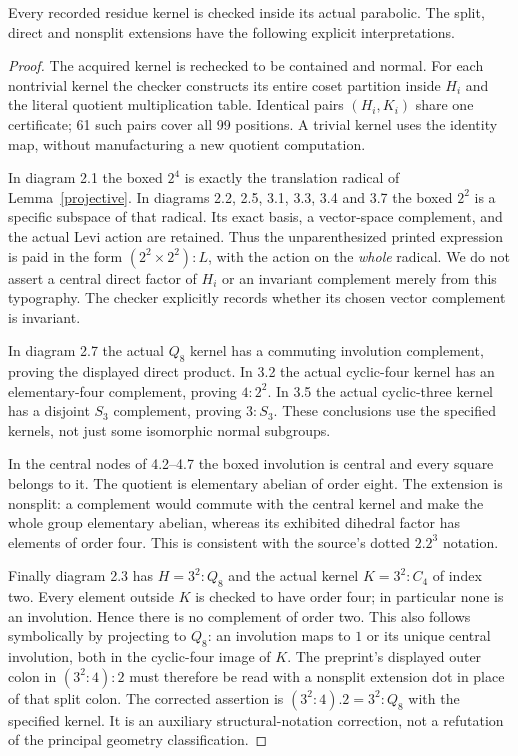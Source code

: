 \documentclass[11pt]{article}
\begin{document}
\begin{lemma}\label{kernel}
Every recorded residue kernel is checked inside its actual parabolic.
The split, direct and nonsplit extensions have the following explicit
interpretations.
\end{lemma}
\begin{proof}
The acquired kernel is rechecked to be contained and normal. For each
nontrivial kernel the checker constructs its entire coset partition
inside $H_i$ and the literal quotient multiplication table. Identical
pairs $(H_i,K_i)$ share one certificate; 61 such pairs cover all 99
positions. A trivial kernel uses the identity map, without manufacturing
a new quotient computation.

In diagram 2.1 the boxed $2^4$ is exactly the translation radical of
Lemma~\ref{projective}. In diagrams 2.2, 2.5, 3.1, 3.3, 3.4 and 3.7
the boxed $2^2$ is a specific subspace of that radical. Its exact basis,
a vector-space complement, and the actual Levi action are retained.
Thus the unparenthesized printed expression is paid in the form
$(2^2\times2^2):L$, with the action on the \emph{whole} radical.
We do not assert a central direct factor of $H_i$ or an invariant
complement merely from this typography. The checker explicitly records
whether its chosen vector complement is invariant.

In diagram 2.7 the actual $Q_8$ kernel has a commuting involution
complement, proving the displayed direct product. In 3.2 the actual
cyclic-four kernel has an elementary-four complement, proving $4:2^2$.
In 3.5 the actual cyclic-three kernel has a disjoint $S_3$ complement,
proving $3:S_3$. These conclusions use the specified kernels, not just
some isomorphic normal subgroups.

In the central nodes of 4.2--4.7 the boxed involution is central and
every square belongs to it. The quotient is elementary abelian of
order eight. The extension is nonsplit: a complement would commute
with the central kernel and make the whole group elementary abelian,
whereas its exhibited dihedral factor has elements of order four.
This is consistent with the source's dotted $2.2^3$ notation.

Finally diagram 2.3 has $H=3^2:Q_8$ and the actual kernel
$K=3^2:C_4$ of index two. Every element outside $K$ is checked to
have order four; in particular none is an involution. Hence there
is no complement of order two. This also follows symbolically by
projecting to $Q_8$: an involution maps to $1$ or its unique central
involution, both in the cyclic-four image of $K$.
The preprint's displayed outer colon in $(3^2:4):2$ must therefore
be read with a nonsplit extension dot in place of that split colon.
The corrected assertion is $(3^2:4).2=3^2:Q_8$ with the specified
kernel. It is an auxiliary structural-notation correction, not a
refutation of the principal geometry classification.
\end{proof}
\end{document}
